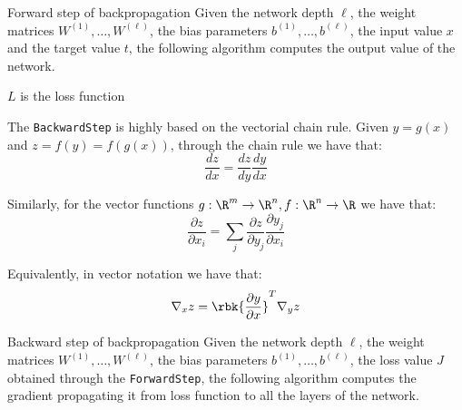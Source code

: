 \documentclass[a4paper, 12pt]{report}
\begin{document}
    \begin{framedalgo}{Forward step of backpropagation}
        Given the network depth $\ell$, the weight matrices $W^{(1)}, \ldots, W^{(\ell)}$, the bias parameters $b^{(1)}, \ldots, b^{(\ell)}$, the input value $x$ and the target value $t$, the following algorithm computes the output value of the network.

        \begin{algorithmic}
                \EndFor
                 \Comment $L$ is the loss function
            \EndFunction
        \end{algorithmic}
    \end{framedalgo}

    The \texttt{BackwardStep} is highly based on the vectorial chain rule. Given $y = g(x)$ and $z = f(y) = f(g(x))$, through the chain rule we have that:
    \[\frac{dz}{dx} = \frac{dz}{dy} \frac{dy}{dx}\]

    Similarly, for the vector functions $g : \R^m \to \R^n, f : \R^n \to \R$ we have that:
    \[\frac{\partial z}{\partial x_i} = \sum_{j} \frac{\partial z}{\partial y_j} \frac{\partial y_j}{\partial x_i}\]

    Equivalently, in vector notation we have that:
    \[\nabla_{x} z = \rbk{\frac{\partial y}{\partial x}}^T \nabla_y z\]

    \begin{framedalgo}{Backward step of backpropagation}
        Given the network depth $\ell$, the weight matrices $W^{(1)}, \ldots, W^{(\ell)}$, the bias parameters $b^{(1)}, \ldots, b^{(\ell)}$, the loss value $J$ obtained through the \texttt{ForwardStep}, the following algorithm computes the gradient propagating it from loss function to all the layers of the network.

        \begin{algorithmic}
                \EndFor
            \EndFunction
        \end{algorithmic}
    \end{framedalgo}
\end{document}

